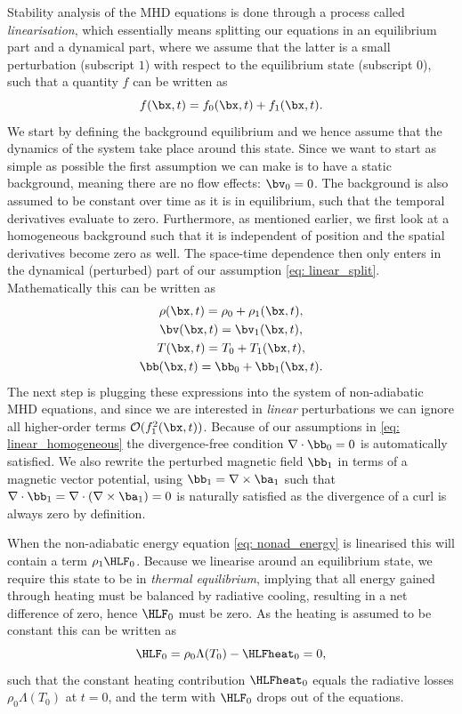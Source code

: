 Stability analysis of the MHD equations is done through a process called \emph{linearisation}, which essentially means splitting our equations in an equilibrium part and a dynamical part, where we assume that the latter is a small perturbation (subscript $1$) with respect to the equilibrium state (subscript $0$), such that a quantity $f$ can be written as
\begin{equation} \label{eq: linear_split}
  f(\bx, t) = f_0(\bx, t) + f_1(\bx, t).
\end{equation}
We start by defining the background equilibrium and we hence assume that the dynamics of the system take place around this state. Since we want to start as simple as possible the first assumption we can make is to have a static background, meaning there are no flow effects: $\bv_0 = 0$. The background is also assumed to be constant over time as it is in equilibrium, such that the temporal derivatives evaluate to zero. Furthermore, as mentioned earlier, we first look at a homogeneous background such that it is independent of position and the spatial derivatives become zero as well. The space-time dependence then only enters in the dynamical (perturbed) part of our assumption \eqref{eq: linear_split}. Mathematically this can be written as
\begin{equation} \label{eq: linear_homogeneous}
  \begin{gathered}
    \rho(\bx, t) = \rho_0 + \rho_1(\bx, t), \\
    \bv(\bx, t) = \bv_1(\bx, t), \\
    T(\bx, t) = T_0 + T_1(\bx, t), \\
    \bb(\bx, t) = \bb_0 + \bb_1(\bx, t).
  \end{gathered}
\end{equation}
The next step is plugging these expressions into the system of non-adiabatic MHD equations, and since we are interested in \emph{linear} perturbations we can ignore all higher-order terms $\mathcal{O}(f_1^2(\bx, t))$. Because of our assumptions in \eqref{eq: linear_homogeneous} the divergence-free condition $\nabla \cdot \bb_0 = 0$ is automatically satisfied. We also rewrite the perturbed magnetic field $\bb_1$ in terms of a magnetic vector potential, using $\bb_1 = \nabla \times \ba_1$ such that $\nabla \cdot \bb_1 = \nabla \cdot \left(\nabla \times \ba_1\right) = 0$ is naturally satisfied as the divergence of a curl is always zero by definition.

When the non-adiabatic energy equation \eqref{eq: nonad_energy} is linearised this will contain a term $\rho_1\HLF_0$. Because we linearise around an equilibrium state, we require this state to be in \emph{thermal equilibrium}, implying that all energy gained through heating must be balanced by radiative cooling, resulting in a net difference of zero, hence $\HLF_0$ must be zero. As the heating is assumed to be constant this can be written as
\begin{equation}
  \HLF_0 = \rho_0\Lambda(T_0) - \HLFheat_0 = 0,
\end{equation}
such that the constant heating contribution $\HLFheat_0$ equals the radiative losses $\rho_0\Lambda(T_0)$ at $t = 0$, and the term with $\HLF_0$ drops out of the equations.

